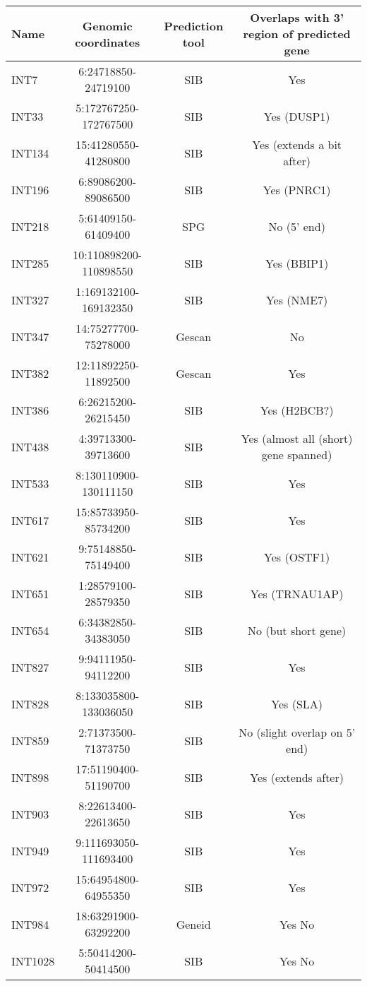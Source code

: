 \begin{table}[h]
    \tiny
    \centering
    \begin{tabular}{lccc}
        \toprule
        Name & Genomic coordinates & Prediction tool & Overlaps with 3' region of predicted gene \\
        \midrule
	INT7 & 6:24718850-24719100 & SIB & Yes \\
	INT33 & 5:172767250-172767500 & SIB & Yes (DUSP1) \\
	INT134 & 15:41280550-41280800 & SIB & Yes (extends a bit after) \\
	INT196 & 6:89086200-89086500 & SIB & Yes (PNRC1) \\
	INT218 & 5:61409150-61409400 & SPG & No (5' end) \\
	INT285 & 10:110898200-110898550 & SIB & Yes (BBIP1) \\
	INT327 & 1:169132100-169132350 & SIB & Yes (NME7) \\
	INT347 & 14:75277700-75278000 & Gescan & No \\
	INT382 & 12:11892250-11892500 & Gescan & Yes \\
	INT386 & 6:26215200-26215450 & SIB & Yes (H2BCB?) \\
	INT438 & 4:39713300-39713600 & SIB & Yes (almost all (short) gene spanned) \\
	INT533 & 8:130110900-130111150 & SIB & Yes \\
	INT617 & 15:85733950-85734200 & SIB & Yes \\
	INT621 & 9:75148850-75149400 & SIB & Yes (OSTF1) \\
	INT651 & 1:28579100-28579350 & SIB & Yes (TRNAU1AP) \\
	INT654 & 6:34382850-34383050 & SIB & No (but short gene)\\
	INT827 & 9:94111950-94112200 & SIB & Yes \\
	INT828 & 8:133035800-133036050 & SIB & Yes (SLA) \\
	INT859 & 2:71373500-71373750 & SIB & No (slight overlap on 5' end) \\
	INT898 & 17:51190400-51190700 & SIB & Yes (extends after)\\
	INT903 & 8:22613400-22613650 & SIB & Yes \\
	INT949 & 9:111693050-111693400 & SIB & Yes \\
	INT972 & 15:64954800-64955350 & SIB & Yes \\
	INT984 & 18:63291900-63292200 & Geneid & Yes No \\
	INT1028 & 5:50414200-50414500 & SIB & Yes No \\

\end{tabular}
\end{table}
